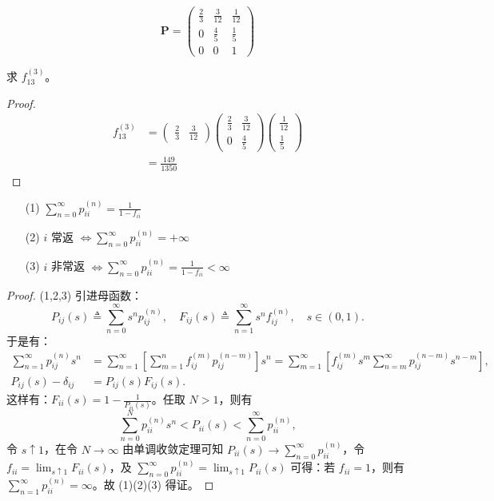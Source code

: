 \documentclass[lang=cn,10pt,thmcnt=section]{elegantbook}
\begin{document}
\begin{example}
	\[
\mathbf{P} = \begin{pmatrix}
\frac{2}{3} & \frac{3}{12} & \frac{1}{12} \\
0 & \frac{4}{5} & \frac{1}{5} \\
0 & 0 & 1
\end{pmatrix}
\]

求 $f_{13}^{(3)}$。
\end{example}
\begin{proof}
	\begin{align*}
		f_{13}^{(3)} &= \left( \begin{array}{cc}
		\frac{2}{3} & \frac{3}{12}
		\end{array} \right)
		\left( \begin{array}{ccc}
		\frac{2}{3} & \frac{3}{12}  \\
		0 & \frac{4}{5} 
		\end{array} \right)
		\left( \begin{array}{c}
		\frac{1}{12} \\
		\frac{1}{5}
		\end{array} \right) \\
		&= \frac{149}{1350}
		\end{align*}
\end{proof}
\begin{theorem}
	\begin{enumerate}
		\item[(1)] $\sum_{n=0}^{\infty} p_{ii}^{(n)} = \frac{1}{1 - f_{ii}}$
		\item[(2)] $i$ 常返 $\Longleftrightarrow \sum_{n=0}^{\infty} p_{ii}^{(n)} = +\infty$
		\item[(3)] $i$ 非常返 $\Longleftrightarrow \sum_{n=0}^{\infty} p_{ii}^{(n)} = \frac{1}{1 - f_{ii}} < \infty$
	\end{enumerate}
\end{theorem}\label{4.5}
\begin{proof}
	(1,2,3) 引进母函数：
\[
P_{ij}(s) \triangleq \sum_{n=0}^{\infty} s^n p_{ij}^{(n)}, \quad F_{ij}(s) \triangleq \sum_{n=1}^{\infty} s^n f_{ij}^{(n)}, \quad s \in (0, 1).
\]
于是有：
\begin{align*}
\sum_{n=1}^{\infty} p_{ij}^{(n)} s^n &= \sum_{n=1}^{\infty} \left[ \sum_{m=1}^{n} f_{ij}^{(m)} p_{ij}^{(n-m)} \right] s^n = \sum_{m=1}^{\infty} \left[ f_{ij}^{(m)} s^m \sum_{n=m}^{\infty} p_{ij}^{(n-m)} s^{n-m} \right], \\
P_{ij}(s) - \delta_{ij} &= P_{ij}(s) F_{ij}(s).
\end{align*}
这样有：$F_{ii}(s) = 1 - \frac{1}{P_{ii}(s)}$。任取 $N > 1$，则有
\[
\sum_{n=0}^{N} p_{ii}^{(n)} s^n < P_{ii}(s) < \sum_{n=0}^{\infty} p_{ii}^{(n)},
\]
令 $s \uparrow 1$，在令 $N \rightarrow \infty$ 由单调收敛定理可知 $P_{ii}(s) \rightarrow \sum_{n=0}^{\infty} p_{ii}^{(n)}$，令 $f_{ii} = \lim_{s \uparrow 1} F_{ii}(s)$，及 $\sum_{n=0}^{\infty} p_{ii}^{(n)} = \lim_{s \uparrow 1} P_{ii}(s)$ 可得：若 $f_{ii} = 1$，则有 $\sum_{n=1}^{\infty} p_{ii}^{(n)} = \infty$。故 (1)(2)(3) 得证。

\end{proof}
\end{document}
